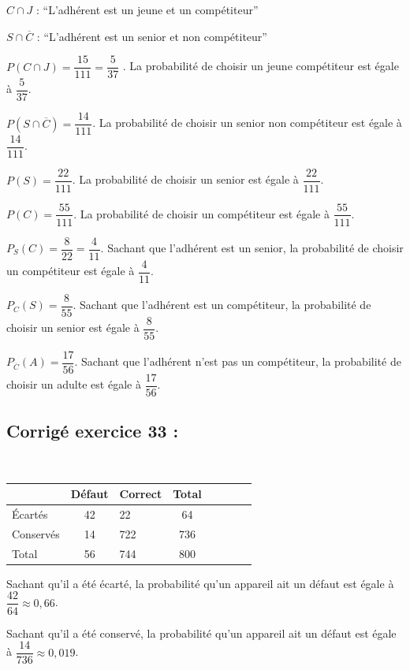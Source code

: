 \documentclass[12pt,a4paper]{book}
\begin{document}
\begin{enumMet}
	\item $C\cap J$ : “L'adhérent est un jeune et un compétiteur”
	
	$S\cap \overline{C}$ : “L'adhérent est un senior et non compétiteur”
	\item 
	\begin{enumMet}
		\item $P(C\cap J)= \dfrac{15}{111} = \dfrac{5}{37}$ . La probabilité de choisir un jeune compétiteur est égale à $\dfrac{5}{37}$.
		
		$P(S\cap \overline{C})= \dfrac{14}{111}$. La probabilité de choisir un senior non compétiteur est égale à $\dfrac{14}{111}$.
		\item $P(S)= \dfrac{22}{111}$. La probabilité de choisir un senior est égale à $\dfrac{22}{111}$.
		
		$P(C)= \dfrac{55}{111}$. La probabilité de choisir un compétiteur est égale à $\dfrac{55}{111}$.
		\item $P_S(C)= \dfrac{8}{22} = \dfrac{4}{11}$. Sachant que l'adhérent est un senior, la probabilité de choisir un compétiteur est égale à $\dfrac{4}{11}$.
		
		$P_C(S)= \dfrac{8}{55}$. Sachant que l'adhérent est un compétiteur, la probabilité de choisir un senior est égale à $\dfrac{8}{55}$.
		
		$P_{\overline{C}}(A)= \dfrac{17}{56} $. Sachant que l'adhérent n'est pas un compétiteur, la probabilité de choisir un adulte est égale à $\dfrac{17}{56}$.
	\end{enumMet}
\end{enumMet}

\subsection*{Corrigé exercice 33 :}


\begin{enumMet}
	\item \,
	\begin{center}
		\begin{tabular}{ | Xc | Xc | Xc | Xc | }
			\hline & Défaut & Correct & Total\\ \hline
			Écartés & 42 & 22 & 64\\ \hline
			Conservés & 14 & 722 & 736\\ \hline
			Total & 56 & 744 & 800\\ \hline
		\end{tabular}
		
	\end{center}
	
	\item Sachant qu'il a été écarté, la probabilité qu'un appareil ait un défaut est égale à $\dfrac{42}{64} \approx 0,66$.
	\item Sachant qu'il a été conservé, la probabilité qu'un appareil ait un défaut est égale à $\dfrac{14}{736} \approx 0,019$.
\end{enumMet}
\end{document}
